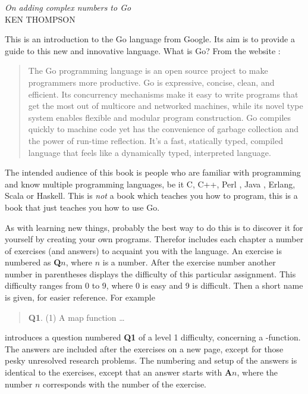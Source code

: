 {\textit{On adding complex numbers to Go}\\ \textsc{KEN THOMPSON}}

\noindent{}This is an introduction to the Go language from Google. Its aim
is to provide a guide to this new and innovative language. What is
Go? From the website \cite{go_web}:
\begin{quote}
The Go programming language is an open source project to make
programmers more productive. Go is expressive, concise, clean, and
efficient. Its concurrency mechanisms make it easy to write programs
that get the most out of multicore and networked machines, while its
novel type system enables flexible and modular program construction. Go
compiles quickly to machine code yet has the convenience of garbage
collection and the power of run-time reflection. It's a fast, statically
typed, compiled language that feels like a dynamically typed,
interpreted language.
\end{quote}

The intended audience of this book is people who are familiar with programming
and know multiple programming languages, be it C\cite{c}, C++\cite{c++}, 
Perl \cite{perl}, Java \cite{java}, Erlang\cite{erlang}, Scala\cite{scala} or
Haskell\cite{haskell}. This is \emph{not} a book which teaches you how to 
program, this is a book that just teaches you how to use Go.

As with
learning new things, probably the best way to do this is to discover it for
yourself by creating your own programs.
Therefor includes each chapter a number of exercises (and answers)
to acquaint you with the language.
An exercise
is numbered as \textbf{Q$n$}, where $n$ is a number. After the
exercise number another number in parentheses displays the difficulty
of this particular assignment. This difficulty ranges from 0 to
9, where 0 is easy and 9 is difficult. 
Then a short name is given, for easier reference.
For example
\begin{verse}
\textbf{Q1}. (1) A map function \ldots
\end{verse}
    
introduces a question numbered \textbf{Q1} of a level 1 difficulty, concerning a
-function. The answers are included after the exercises on a
new page, except for those pesky unresolved research problems.
The numbering and setup of the answers is identical to the
exercises, except that an answer starts with \textbf{A$n$}, where the
number $n$ corresponds with the number of the exercise.


